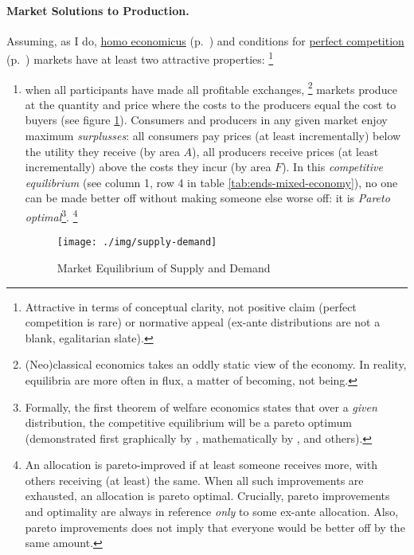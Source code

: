 \paragraph{Market Solutions to Production.}  \label{sec:market-solutions-production}
Assuming, as I do, \hyperref[it:homoeconomicus]{homo economicus} (p.~\pageref{it:homoeconomicus})  and conditions for \hyperref[sec:perfect-competition]{perfect competition} (p.~\pageref{sec:perfect-competition}) markets have at least two attractive properties:
\footnote{
	Attractive in terms of conceptual clarity, not positive claim (perfect competition is rare) or normative appeal (ex-ante distributions are not a blank, egalitarian slate).
}
\begin{enumerate}
	\item when all  participants have made all profitable exchanges,
	\footnote{
		(Neo)classical economics takes an oddly static view of the economy.
		In reality, equilibria are more often in flux, a matter of becoming, not being.
	}
	markets produce at the quantity and price where the costs to the producers equal the cost to buyers (see figure \ref{fig:supply-demand}).
	Consumers and producers in any given market enjoy maximum \emph{surplusses}:
	all consumers pay prices (at least incrementally) below the utility they receive (by area $A$), all producers receive prices (at least incrementally) above the costs they incur (by area $F$).
	In this \emph{competitive equilibrium} (see column 1, row 4 in table \ref{tab:ends-mixed-economy}), no one can be made better off without making someone else worse off:
	it is \emph{Pareto optimal}\footnote{
		\label{fn:1sttheorem} Formally, the first theorem of welfare economics states that over a \emph{given} distribution, the competitive equilibrium will be a pareto optimum (demonstrated first graphically by \cite{Lerner1944}, mathematically by \cite{Lange1934}, \cite{Debreu1954} and others).}.
		\footnote{
			An allocation is pareto-improved if at least someone receives more, with others receiving (at least) the same.
			When all such improvements are exhausted, an allocation is pareto optimal.
			Crucially, pareto improvements and optimality are always in reference \emph{only} to some ex-ante allocation.
			Also, pareto improvements does not imply that everyone would be better off by the same amount.
		}
	\begin{figure}[htbp]
		\centering
		\texttt{[image: ./img/supply-demand]}
		\caption{Market Equilibrium of Supply and Demand}
		\label{fig:supply-demand}
	\end{figure}

\end{enumerate}
